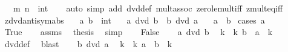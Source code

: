 \begin{isabellebody}
\ \ \ m\ n\ {\isacharcolon}{\kern0pt}{\isacharcolon}{\kern0pt}\ int\isanewline
%
\isadelimproof
\ \ %
\endisadelimproof
%
\isatagproof
{}\isamarkupfalse%
\ {\isacharparenleft}{\kern0pt}auto\ simp\ add{\isacharcolon}{\kern0pt}\ dvd{\isacharunderscore}{\kern0pt}def\ mult{\isachardot}{\kern0pt}assoc\ zero{\isacharunderscore}{\kern0pt}le{\isacharunderscore}{\kern0pt}mult{\isacharunderscore}{\kern0pt}iff\ zmult{\isacharunderscore}{\kern0pt}eq{\isacharunderscore}{\kern0pt}{}{\isacharunderscore}{\kern0pt}iff{\isacharparenright}{\kern0pt}%
\endisatagproof
{\isafoldproof}%
%
\isadelimproof
\isanewline
%
\endisadelimproof
\isanewline
{}\isamarkupfalse%
\ zdvd{\isacharunderscore}{\kern0pt}antisym{\isacharunderscore}{\kern0pt}abs{\isacharcolon}{\kern0pt}\isanewline
\ \ \ a\ b\ {\isacharcolon}{\kern0pt}{\isacharcolon}{\kern0pt}\ int\isanewline
\ \ \ {\isachardoublequoteopen}a\ dvd\ b{\isachardoublequoteclose}\ \ {\isachardoublequoteopen}b\ dvd\ a{\isachardoublequoteclose}\isanewline
\ \ \ {\isachardoublequoteopen}{\isasymbar}a{\isasymbar}\ {\isacharequal}{\kern0pt}\ {\isasymbar}b{\isasymbar}{\isachardoublequoteclose}\isanewline
%
\isadelimproof
%
\endisadelimproof
%
\isatagproof
{}\isamarkupfalse%
\ {\isacharparenleft}{\kern0pt}cases\ {\isachardoublequoteopen}a\ {\isacharequal}{\kern0pt}\ {}{\isachardoublequoteclose}{\isacharparenright}{\kern0pt}\isanewline
\ \ \isamarkupfalse%
\ True\isanewline
\ \ \isamarkupfalse%
\ assms\ \isamarkupfalse%
\ {\isacharquery}{\kern0pt}thesis\ \isamarkupfalse%
\ simp\isanewline
{}\isamarkupfalse%
\isanewline
\ \ \isamarkupfalse%
\ False\isanewline
\ \ \isamarkupfalse%
\ {\isacartoucheopen}a\ dvd\ b{\isacartoucheclose}\ \isamarkupfalse%
\ k\ \ k{\isacharcolon}{\kern0pt}\ {\isachardoublequoteopen}b\ {\isacharequal}{\kern0pt}\ a\ {\isacharasterisk}{\kern0pt}\ k{\isachardoublequoteclose}\isanewline
\ \ \ \ \isamarkupfalse%
\ dvd{\isacharunderscore}{\kern0pt}def\ \isamarkupfalse%
\ blast\isanewline
\ \ \isamarkupfalse%
\ {\isacartoucheopen}b\ dvd\ a{\isacartoucheclose}\ \isamarkupfalse%
\ k{\isacharprime}{\kern0pt}\ \ k{\isacharprime}{\kern0pt}{\isacharcolon}{\kern0pt}\ {\isachardoublequoteopen}a\ {\isacharequal}{\kern0pt}\ b\ {\isacharasterisk}{\kern0pt}\ k{\isacharprime}{\kern0pt}{\isachardoublequoteclose}\isanewline

\end{isabellebody}
